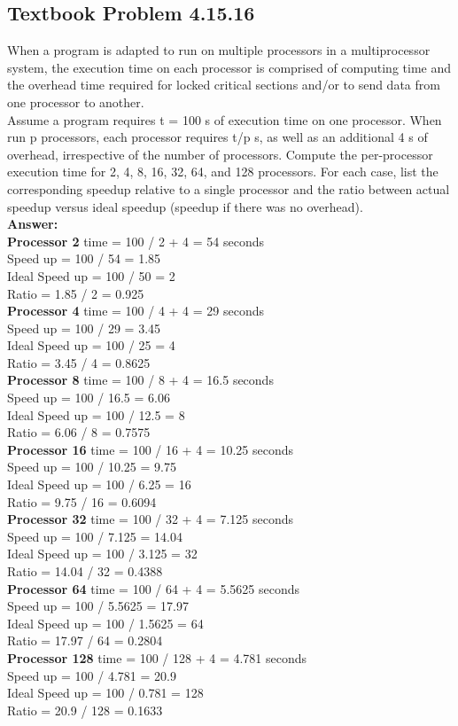 \documentclass[12pt]{article}
\begin{document}
\subsection{Textbook Problem 4.15.16}
When a program is adapted to run on multiple processors in a multiprocessor system, the execution time on each processor is comprised of computing time and the overhead time required for locked critical sections and/or to send data from one processor to another.
\\
Assume a program requires t = 100 s of execution time on one processor. When run p processors, each processor requires t/p s, as well as an additional 4 s of overhead, irrespective of the number of processors. Compute the per-processor execution time for 2, 4, 8, 16, 32, 64, and 128 processors. For each case, list the corresponding speedup relative to a single processor and the ratio between actual speedup versus ideal speedup (speedup if there was no overhead).
\\
\textbf{Answer:}
\\
\textbf{Processor 2} time = 100 / 2 + 4 = 54 seconds\\
Speed up = 100 / 54 = 1.85\\
Ideal Speed up = 100 / 50 = 2\\
Ratio = 1.85 / 2 = 0.925\\[0.15in]
\textbf{Processor 4} time = 100 / 4 + 4 = 29 seconds\\
Speed up = 100 / 29 = 3.45\\
Ideal Speed up = 100 / 25 = 4\\
Ratio = 3.45 / 4 = 0.8625\\[0.15in]
\textbf{Processor 8} time = 100 / 8 + 4 = 16.5 seconds\\
Speed up = 100 / 16.5 = 6.06\\
Ideal Speed up = 100 / 12.5 = 8\\
Ratio = 6.06 / 8 = 0.7575\\[0.15in]
\textbf{Processor 16} time = 100 / 16 + 4 = 10.25 seconds\\
Speed up = 100 / 10.25 = 9.75\\
Ideal Speed up = 100 / 6.25 = 16\\
Ratio = 9.75 / 16 = 0.6094\\[0.15in]
\textbf{Processor 32} time = 100 / 32 + 4 = 7.125 seconds\\
Speed up = 100 / 7.125 = 14.04\\
Ideal Speed up = 100 / 3.125 = 32\\
Ratio = 14.04 / 32 = 0.4388\\[0.15in]
\textbf{Processor 64} time = 100 / 64 + 4 = 5.5625 seconds\\
Speed up = 100 / 5.5625 = 17.97\\
Ideal Speed up = 100 / 1.5625 = 64\\
Ratio = 17.97 / 64 = 0.2804\\[0.15in]
\textbf{Processor 128} time = 100 / 128 + 4 = 4.781 seconds\\
Speed up = 100 / 4.781 = 20.9\\
Ideal Speed up = 100 / 0.781 = 128\\
Ratio = 20.9 / 128 = 0.1633\\[0.15in]
\end{document}
